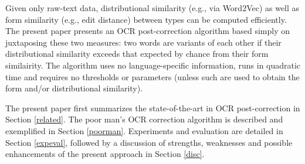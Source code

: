 \documentclass{sig-alternate}
\begin{document}
Given only raw-text data, distributional similarity (e.g., via
Word2Vec) as well as form similarity (e.g., edit distance) between
types can be computed efficiently. The present paper presents an OCR
post-correction algorithm based simply on juxtaposing these two
measures: two words are variants of each other if their distributional
similarity exceeds that expected by chance from their form
similairity. The algorithm uses no language-specific information, runs
in quadratic time and requires no thresholds or parameters (unless
such are used to obtain the form and/or distributional
similarity).

The present paper first summarizes the state-of-the-art in OCR
post-correction in Section \ref{related}. The poor man's OCR
correction algorithm is described and exemplified in Section
\ref{poorman}. Experiments and evaluation are detailed in Section
\ref{expeval}, followed by a discussion of strengths, weaknesses and
possible enhancements of the present approach in Section \ref{disc}.


\end{document}
